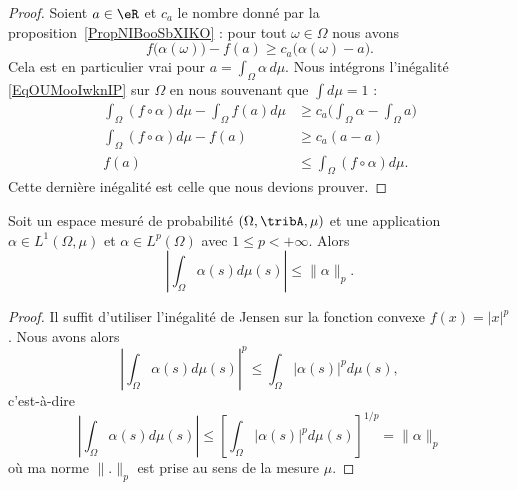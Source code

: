 \begin{proof}
	Soient \( a\in \eR\) et \( c_a\) le nombre donné par la proposition~\ref{PropNIBooSbXIKO} : pour tout \( \omega\in \Omega\) nous avons
	\begin{equation}    \label{EqOUMooIwknIP}
		f\big( \alpha(\omega) \big)-f(a)\geq c_a\big( \alpha(\omega)-a \big).
	\end{equation}
	Cela est en particulier vrai pour \( a=\int_{\Omega}\alpha\,d\mu\). Nous intégrons l'inégalité \eqref{EqOUMooIwknIP} sur \( \Omega\) en nous souvenant que \( \int d\mu=1\) :
	\begin{subequations}
		\begin{align}
			\int_{\Omega}(f\circ \alpha)d\mu-\int_{\Omega}f(a)d\mu & \geq c_a\big( \int_{\Omega}\alpha-\int_{\Omega}a \big) \\
			\int_{\Omega}(f\circ \alpha)d\mu-f(a)                  & \geq c_a(a-a)                                          \\
			f(a)                                                   & \leq \int_{\Omega}(f\circ\alpha)d\mu.
		\end{align}
	\end{subequations}
	Cette dernière inégalité est celle que nous devions prouver.
\end{proof}

\begin{corollary}		\label{CORooRYUAooOHRsjL}
	Soit un espace mesuré de probabilité \( (\Omega,\tribA,\mu)\) et une application \( \alpha\in L^1(\Omega,\mu)\) et \( \alpha\in L^p(\Omega)\) avec \( 1\leq p<+\infty\). Alors
	\begin{equation}
		| \int_{\Omega}\alpha(s)d\mu(s) |\leq \| \alpha \|_p.
	\end{equation}
\end{corollary}

\begin{proof}
	Il suffit d'utiliser l'inégalité de Jensen sur la fonction convexe \( f(x)=| x |^p\). Nous avons alors
	\begin{equation}
		| \int_{\Omega}\alpha(s)d\mu(s) |^p\leq \int_{\Omega}| \alpha(s) |^pd\mu(s),
	\end{equation}
	c'est-à-dire
	\begin{equation}
		| \int_{\Omega}\alpha(s)d\mu(s) |\leq  \left[  \int_{\Omega}| \alpha(s) |^pd\mu(s)\right]^{1/p}=\| \alpha \|_p
	\end{equation}
	où ma norme \( \| . \|_p\) est prise au sens de la mesure \( \mu\).
\end{proof}

